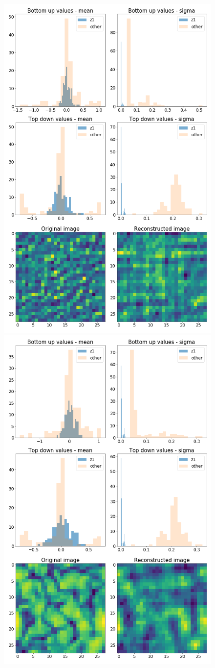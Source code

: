 \documentclass[12pt, english]{article}
\begin{document}
\begin{figure}[H]
  \begin{minipage}{0.5\linewidth}
    \centering
    \includegraphics[width=.6\linewidth]{z1_vis/z1_vis_no_contrast_norm/17_DenseLinLinLadderVAE_contrastNorm-stats-1_TD_BU_COMPS_1.png}
  \end{minipage}
  \begin{minipage}{0.5\linewidth}
    \centering
    \includegraphics[width=.6\linewidth]{z1_vis/z1_vis_no_contrast_norm/17_DenseLinLinLadderVAE_contrastNorm-stats-2_TD_BU_COMPS_1.png} 
  \end{minipage}


\end{figure}
\end{document}
